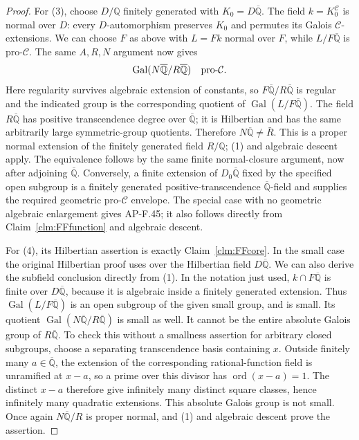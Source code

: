 \documentclass[11pt]{article}
\begin{document}
\begin{proof}
For (3), choose \(D/\mathbb Q\) finitely generated with
\(K_0=D\overline{\mathbb Q}\). The field
\(k=K_0^{\mathcal C}\) is normal over \(D\): every
\(D\)-automorphism preserves \(K_0\) and permutes its
Galois \(\mathcal C\)-extensions. We can choose \(F\)
as above with \(L=Fk\) normal over \(F\), while
\(L/F\overline{\mathbb Q}\) is pro-\(\mathcal C\).
The same \(A,R,N\) argument now gives
\[
 \operatorname{Gal}
   (N\overline{\mathbb Q}/R\overline{\mathbb Q})
 \quad\hbox{pro-}\mathcal C.
\]
Here regularity survives algebraic extension of constants,
so \(F\overline{\mathbb Q}/R\overline{\mathbb Q}\)
is regular and the indicated group is the corresponding
quotient of \(\operatorname{Gal}
(L/F\overline{\mathbb Q})\). The field
\(R\overline{\mathbb Q}\) has positive transcendence
degree over \(\overline{\mathbb Q}\); it is Hilbertian
and has the same arbitrarily large symmetric-group quotients.
Therefore \(N\overline{\mathbb Q}\ne\bar R\).
This is a proper normal extension of the finitely generated
field \(R/\mathbb Q\); (1) and algebraic descent apply.
The equivalence follows by the same finite normal-closure
argument, now after adjoining \(\overline{\mathbb Q}\).
Conversely, a finite extension of
\(D_0\overline{\mathbb Q}\) fixed by the specified open
subgroup is a finitely generated positive-transcendence
\(\overline{\mathbb Q}\)-field and supplies the required
geometric pro-\(\mathcal C\) envelope. The special case
with no geometric algebraic enlargement gives AP-F.45;
it also follows directly from Claim~\ref{clm:FFfunction}
and algebraic descent.

For (4), its Hilbertian assertion is exactly
Claim~\ref{clm:FFcore}. In the small case the original
Hilbertian proof uses
\citet[Theorem~4.4]{FF_BarySoroker2008} over the Hilbertian
field \(D\overline{\mathbb Q}\). We can also derive
the subfield conclusion directly from (1).
In the notation just used, \(k\cap F\overline{\mathbb Q}\)
is finite over \(D\overline{\mathbb Q}\), because it
is algebraic inside a finitely generated extension.
Thus \(\operatorname{Gal}(L/F\overline{\mathbb Q})\)
is an open subgroup of the given small group, and is small.
Its quotient
\(\operatorname{Gal}(N\overline{\mathbb Q}/
R\overline{\mathbb Q})\) is small as well. It cannot
be the entire absolute Galois group of
\(R\overline{\mathbb Q}\). To check this without a
smallness assertion for arbitrary closed subgroups, choose
a separating transcendence basis containing \(x\).
Outside finitely many \(a\in\overline{\mathbb Q}\),
the extension of the corresponding rational-function field
is unramified at \(x-a\), so a prime over this divisor
has \(\operatorname{ord}(x-a)=1\). The distinct
\(x-a\) therefore give infinitely many distinct square
classes, hence infinitely many quadratic extensions.
This absolute Galois group is not small. Once again
\(N\overline{\mathbb Q}/R\) is proper normal, and (1)
and algebraic descent prove the assertion.


\end{proof}
\end{document}
